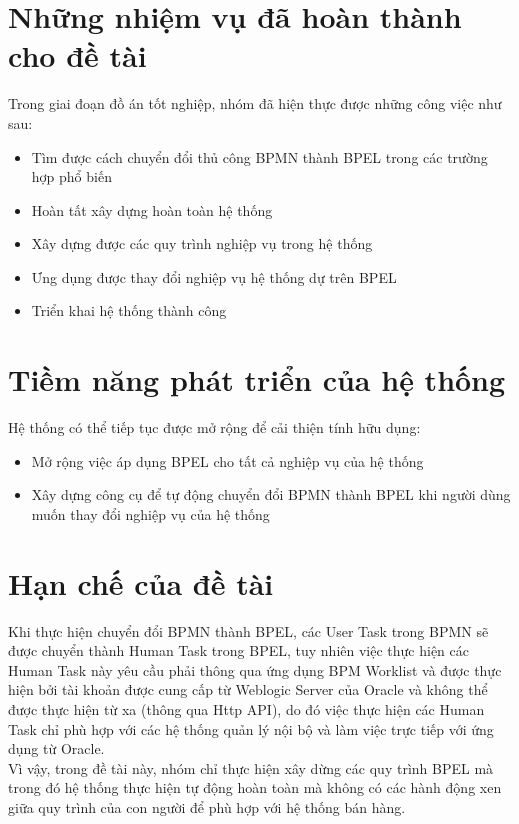 \section{Những nhiệm vụ đã hoàn thành cho đề tài}
Trong giai đoạn đồ án tốt nghiệp, nhóm đã hiện thực được những công việc như sau:
\begin{itemize}
    \item Tìm được cách chuyển đổi thủ công BPMN thành BPEL trong các trường hợp phổ biến
    \item Hoàn tất xây dựng hoàn toàn hệ thống
    \item Xây dựng được các quy trình nghiệp vụ trong hệ thống
    \item Ưng dụng được thay đổi nghiệp vụ hệ thống dự trên BPEL
    \item Triển khai hệ thống thành công
\end{itemize}

\section{Tiềm năng phát triển của hệ thống}
Hệ thống có thể tiếp tục được mở rộng để cải thiện tính hữu dụng:
\begin{itemize}
    \item Mở rộng việc áp dụng BPEL cho tất cả nghiệp vụ của hệ thống
    \item Xây dựng công cụ để tự động chuyển đổi BPMN thành BPEL khi người dùng muốn thay đổi nghiệp vụ của hệ thống
\end{itemize}

\section{Hạn chế của đề tài}
\hspace{0.5cm} Khi thực hiện chuyển đổi BPMN thành BPEL, các User Task trong BPMN sẽ được chuyển thành Human Task trong BPEL, tuy nhiên việc thực hiện các Human Task này yêu cầu phải thông qua ứng dụng BPM Worklist và được thực hiện bởi tài khoản được cung cấp từ Weblogic Server của Oracle và không thể được thực hiện từ xa (thông qua Http API), do đó việc thực hiện các Human Task chỉ phù hợp với các hệ thống quản lý nội bộ và làm việc trực tiếp với ứng dụng từ Oracle. \\

Vì vậy, trong đề tài này, nhóm chỉ thực hiện xây dừng các quy trình BPEL mà trong đó hệ thống thực hiện tự động hoàn toàn mà không có các hành động xen giữa quy trình của con người để phù hợp với hệ thống bán hàng.








